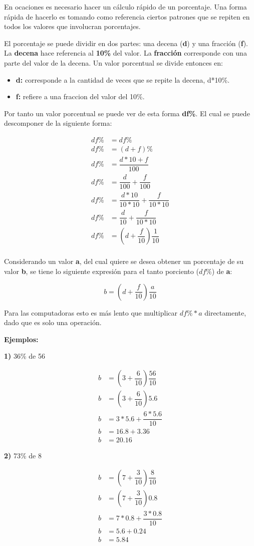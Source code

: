 En ocaciones es necesario hacer un cálculo rápido de un porcentaje. Una forma rápida de hacerlo es tomando como referencia ciertos patrones que se repiten en todos los valores que involucran porcentajes.

El porcentaje se puede dividir en dos partes: una decena (\textbf{d}) y una fracción (\textbf{f}). La \textbf{decena} hace referencia al \textbf{10\%} del valor. La \textbf{fracción} corresponde con una parte del valor de la decena. Un valor porcentual se divide entonces en:

\begin{itemize}
  \item \textbf{d:} corresponde a la cantidad de veces que se repite la decena, d*10\%.
  \item \textbf{f:} refiere a una fraccion del valor del 10\%.
\end{itemize}

Por tanto un valor porcentual se puede ver de esta forma \textbf{df\%}. El cual se puede descomponer de la siguiente forma:

\begin{align*}
  df\% &= df\% \\
  df\% &= (d + f)\% \\
  df\% &=\dfrac{d*10 + f}{100} \\
  df\% &= \dfrac{d}{100} + \dfrac{f}{100} \\
  df\% &= \dfrac{d*10}{10*10} + \dfrac{f}{10*10} \\
  df\% &= \dfrac{d}{10} + \dfrac{f}{10*10} \\
  df\% &= \left( d + \dfrac{f}{10} \right)\dfrac{1}{10} \\
\end{align*}

Considerando un valor \textbf{a}, del cual quiere se desea obtener un porcentaje de su valor \textbf{b}, se tiene lo siguiente expresión para el tanto porciento ($df\%$) de \textbf{a}:

\[\boxed{
  b = \left( d + \dfrac{f}{10} \right)\dfrac{a}{10}
}\]

Para las computadoras esto es más lento que multiplicar $df\%*a$ directamente, dado que es solo una operación.

\textbf{Ejemplos:}

\textbf{1)} 36\% de 56

\begin{align*}
  b &= \left( 3 + \dfrac{6}{10} \right)\dfrac{56}{10} \\
  b &= \left( 3 + \dfrac{6}{10} \right)5.6 \\
  b &= 3*5.6 + \dfrac{6*5.6}{10} \\
  b &= 16.8 + 3.36 \\
  b &= 20.16
\end{align*}

\textbf{2)} 73\% de 8

\begin{align*}
  b &= \left( 7 + \dfrac{3}{10} \right)\dfrac{8}{10} \\
  b &= \left( 7 + \dfrac{3}{10} \right)0.8 \\
  b &= 7*0.8 + \dfrac{3*0.8}{10} \\
  b &= 5.6 + 0.24 \\
  b &= 5.84
\end{align*}
